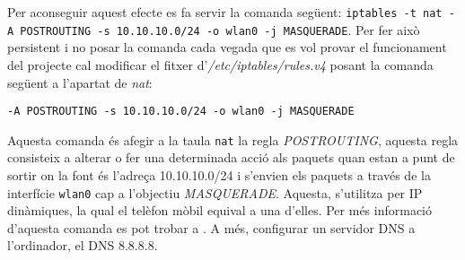 Per aconseguir aquest efecte es fa servir la comanda següent:
\texttt{iptables -t nat -A POSTROUTING -s 10.10.10.0/24 -o wlan0 -j MASQUERADE}.
Per fer això persistent i no posar la comanda cada vegada que es vol
provar el funcionament del projecte cal modificar el fitxer d'\emph{/etc/iptables/rules.v4}
posant la comanda següent a l'apartat de \emph{nat}:

\texttt{-A POSTROUTING -s 10.10.10.0/24 -o wlan0 -j MASQUERADE}


Aquesta comanda és afegir a la taula \texttt{nat} la regla \emph{POSTROUTING},
aquesta regla consisteix a alterar o fer una determinada acció als paquets quan estan a punt de sortir
on la font és l'adreça 10.10.10.0/24 i s'envien els paquets a través de
la interfície \texttt{wlan0} cap a l'objectiu \emph{MASQUERADE}.
Aquesta, s'utilitza per IP dinàmiques, la qual el telèfon mòbil equival a una d'elles.
Per més informació d'aquesta comanda es pot trobar a \autocite{man_iptables}.
A més, configurar un servidor DNS a l'ordinador, el DNS 8.8.8.8.